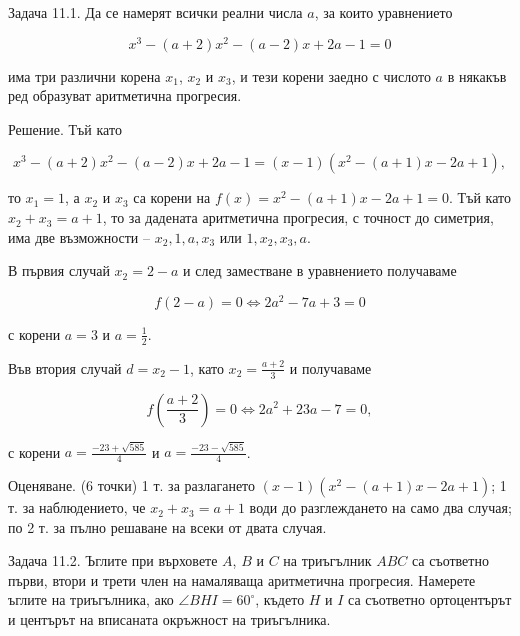 
Задача 11.1. Да се намерят всички реални числа $a$, за които уравнението

$$x^3-(a+2)x^2-(a-2)x+2a-1=0$$

има три различни корена $x_1$, $x_2$ и $x_3$, и тези корени заедно с числото $a$ в някакъв ред образуват аритметична прогресия.

Решение. Тъй като

$$x^3-(a+2)x^2-(a-2)x+2a-1=(x-1)(x^2-(a+1)x-2a+1),$$

то $x_1=1$, а $x_2$ и $x_3$ са корени на $f(x)=x^2-(a+1)x-2a+1=0$. Тъй като $x_2+x_3=a+1$, то за дадената аритметична прогресия, с точност до симетрия, има две възможности – $x_2,1,a,x_3$ или $1,x_2,x_3,a$.

В първия случай $x_2=2-a$ и след заместване в уравнението получаваме

$$f(2-a)=0\Longleftrightarrow2a^2-7a+3=0$$

с корени $a=3$ и $a=\frac12$.

Във втория случай $d=x_2-1$, като $x_2=\frac{a+2}{3}$ и получаваме

$$f\left(\frac{a+2}{3}\right)=0\Longleftrightarrow2a^2+23a-7=0,$$

с корени $a=\frac{-23+\sqrt{585}}4$ и $a=\frac{-23-\sqrt{585}}4$.

Оценяване. (6 точки) 1 т. за разлагането $(x-1)(x^2-(a+1)x-2a+1)$; 1 т. за наблюдението, че $x_2+x_3=a+1$ води до разглеждането на само два случая; по 2 т. за пълно решаване на всеки от двата случая.

Задача 11.2. Ъглите при върховете $A$, $B$ и $C$ на триъгълник $ABC$ са съответно първи, втори и трети член на намаляваща аритметична прогресия. Намерете ъглите на триъгълника, ако $\angle BHI=60^\circ$, където $H$ и $I$ са съответно ортоцентърът и центърът на вписаната окръжност на триъгълника.


